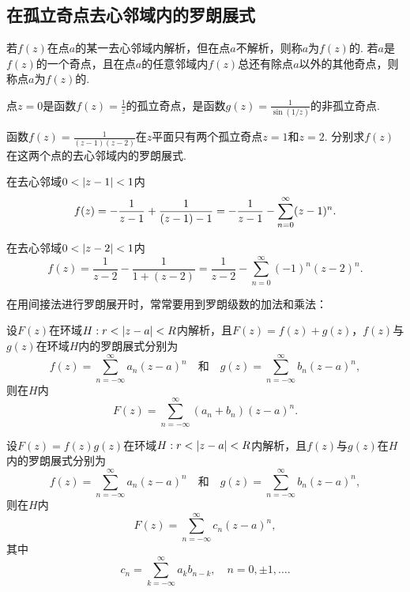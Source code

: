 \subsection{在孤立奇点去心邻域内的罗朗展式}
\begin{definition}
若\(f(z)\)在点\(a\)的某一去心邻域内解析，但在点\(a\)不解析，则称\(a\)为\(f(z)\)的.
若\(a\)是\(f(z)\)的一个奇点，且在点\(a\)的任意邻域内\(f(z)\)总还有除点\(a\)以外的其他奇点，则称点\(a\)为\(f(z)\)的.
\end{definition}

\begin{example}
点\(z=0\)是函数\(f(z) = \frac{1}{z}\)的孤立奇点，是函数\(g(z) = \frac{1}{\sin(1/z)}\)的非孤立奇点.
\end{example}

\begin{example}
函数\(f(z) = \frac{1}{(z-1)(z-2)}\)在\(z\)平面只有两个孤立奇点\(z=1\)和\(z=2\).
分别求\(f(z)\)在这两个点的去心邻域内的罗朗展式.
\begin{solution}
在去心邻域\(0<\abs{z-1}<1\)内\[
f(z) = -\frac{1}{z-1} + \frac{1}{(z-1)-1} \\
= -\frac{1}{z-1} - \sum\limits_{n=0}^\infty (z-1)^n.
\]

在去心邻域\(0<\abs{z-2}<1\)内\[
f(z) = \frac{1}{z-2} - \frac{1}{1+(z-2)}
= \frac{1}{z-2} - \sum\limits_{n=0}^\infty (-1)^n (z-2)^n.
\]
\end{solution}
\end{example}

在用间接法进行罗朗展开时，常常要用到罗朗级数的加法和乘法：
\begin{theorem}[罗朗级数的加法]
设\(F(z)\)在环域\(H: r < \abs{z-a} < R\)内解析，且\(F(z) = f(z) + g(z)\)，\(f(z)\)与\(g(z)\)在环域\(H\)内的罗朗展式分别为\[
f(z) = \sum\limits_{n=-\infty}^\infty a_n (z-a)^n
\quad\text{和}\quad
g(z) = \sum\limits_{n=-\infty}^\infty b_n (z-a)^n,
\]则在\(H\)内\[
F(z) = \sum\limits_{n=-\infty}^\infty (a_n+b_n) (z-a)^n.
\]
\end{theorem}

\begin{theorem}[罗朗级数的乘法]
设\(F(z) = f(z) g(z)\)在环域\(H: r < \abs{z-a} < R\)内解析，且\(f(z)\)与\(g(z)\)在\(H\)内的罗朗展式分别为\[
f(z) = \sum\limits_{n=-\infty}^\infty a_n (z-a)^n
\quad\text{和}\quad
g(z) = \sum\limits_{n=-\infty}^\infty b_n (z-a)^n,
\]则在\(H\)内\[
F(z) = \sum\limits_{n=-\infty}^\infty c_n (z-a)^n,
\]其中\[
c_n = \sum\limits_{k=-\infty}^\infty a_k b_{n-k},
\quad n=0,\pm1,\dotsc.
\]
\end{theorem}

